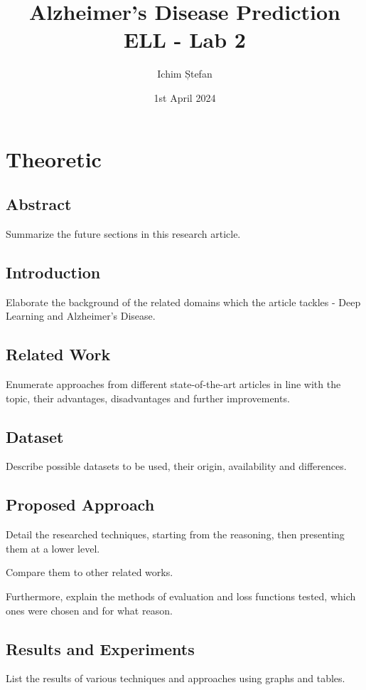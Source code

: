 \documentclass[a4paper]{article}
\title{
    Alzheimer's Disease Prediction \\
    ELL - Lab 2
}
\author{Ichim Ștefan}
\date{1st April 2024}
\begin{document}
\maketitle

\tableofcontents

\newpage

\section{Theoretic}

\subsection{Abstract}
Summarize the future sections in this research article.

\subsection{Introduction}
Elaborate the background of the related domains which the article tackles - Deep Learning and Alzheimer's Disease.

\subsection{Related Work}
Enumerate approaches from different state-of-the-art articles in line with the topic, their advantages, disadvantages and
further improvements.

\subsection{Dataset}
Describe possible datasets to be used, their origin, availability and differences.

\subsection{Proposed Approach}
Detail the researched techniques, starting from the reasoning, then presenting them at a lower level.

Compare them to other related works.

Furthermore, explain the methods of evaluation and loss functions tested, which ones were chosen and for what reason.

\subsection{Results and Experiments}
List the results of various techniques and approaches using graphs and tables.
\end{document}
